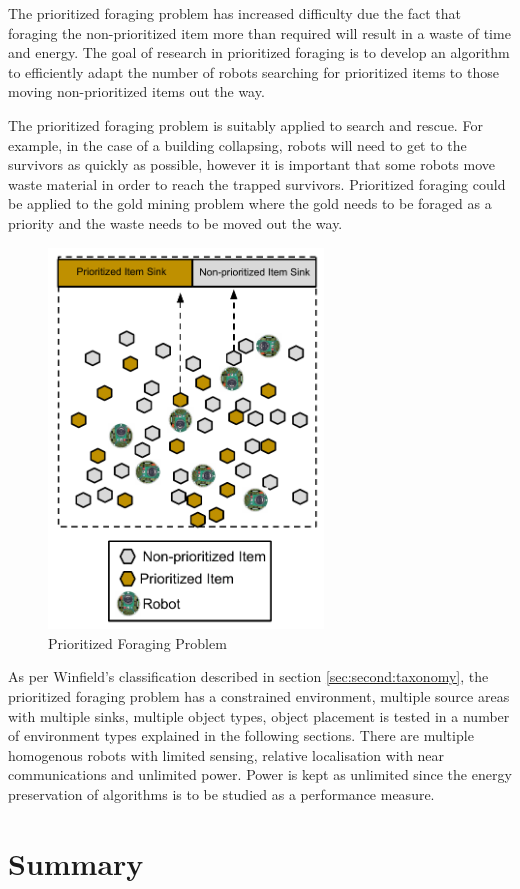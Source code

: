 The prioritized foraging problem has increased difficulty due the fact that  foraging the non-prioritized item more than required will result in a waste of time and energy. The goal of research in prioritized foraging is to develop an algorithm to efficiently adapt the number of robots searching for prioritized items to those moving non-prioritized items out the way. 

The prioritized foraging problem is suitably applied to search and rescue. For example, in the case of a building collapsing, robots will need to get to the survivors as quickly as possible, however it is important that some robots move waste material in order to reach the trapped survivors. Prioritized foraging could be applied to the gold mining problem where the gold needs to be foraged as a priority and the waste needs to be moved out the way.


\begin{figure} [h]
	\centering
	\includegraphics[width=0.65\textwidth]{chapters/chapter2/figures/EpuckGoldMining.pdf}
	\caption{Prioritized Foraging Problem }
	\label{prioritizedforaging}
\end{figure}

As per Winfield's classification described in section \ref{sec:second:taxonomy}, the prioritized foraging problem has a constrained environment, multiple source areas with multiple sinks, multiple object types, object placement is tested in a number of environment types explained in the following sections. There are multiple homogenous robots with limited sensing, relative localisation with near communications and unlimited power. Power is kept as unlimited since the energy preservation of algorithms is to be studied as a performance measure. 

\section{Summary}
\label{sec:second:summary}

%
%